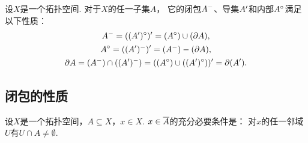 \begin{theorem}
设\(X\)是一个拓扑空间.
对于\(X\)的任一子集\(A\)，
它的闭包\(A^-\)、导集\(A'\)和内部\(A^\circ\)满足以下性质：\begin{gather*}
	A^-
	= ((A')^\circ)'
	= (A^\circ) \cup (\partial A), \\
	A^\circ
	= ((A')^-)'
	= (A^-) - (\partial A), \\
	\partial A
	= (A^-) \cap ((A')^-)
	= ((A^\circ) \cup ((A')^\circ))'
	= \partial (A').
\end{gather*}
\end{theorem}

\subsection{闭包的性质}
\begin{proposition}\label{theorem:拓扑学.一点属于闭包的充分必要条件}
设\(X\)是一个拓扑空间，\(A \subseteq X\)，\(x \in X\).
\(x \in \overline{A}\)的充分必要条件是：
对\(x\)的任一邻域\(U\)有\(U \cap A \neq \emptyset\).
\end{proposition}

